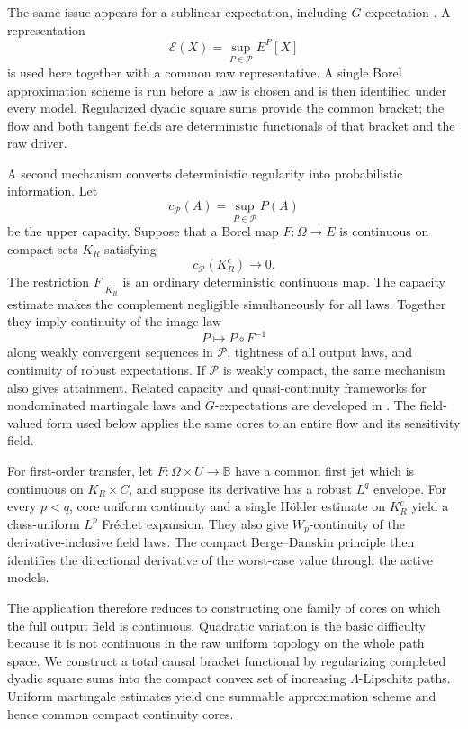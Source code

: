 \documentclass[11pt,reqno]{amsart}
\theoremstyle{plain}
\theoremstyle{definition}
\newcommand{\cP}{\mathcal P}
\begin{document}
The same issue appears for a sublinear expectation, including
\(G\)-expectation \cite{Peng19}.  A representation
\[
  \mathcal E(X)=\sup_{P\in\cP}E^P[X]
\]
is used here together with a common raw representative.  A single Borel
approximation scheme is run before a law is chosen and is then identified
under every model.  Regularized dyadic square sums provide the common
bracket; the flow and both tangent fields are deterministic functionals of
that bracket and the raw driver.

A second mechanism converts deterministic regularity into probabilistic
information.  Let
\[
  c_{\cP}(A)=\sup_{P\in\cP}P(A)
\]
be the upper capacity.  Suppose that a Borel map \(F:\Omega\to E\) is
continuous on compact sets \(K_R\) satisfying
\[
  c_{\cP}(K_R^c)\longrightarrow0.
\]
The restriction \(F|_{K_R}\) is an ordinary deterministic continuous map.
The capacity estimate makes the complement negligible simultaneously for
all laws.  Together they imply continuity of the image law
\[
  P\longmapsto P\circ F^{-1}
\]
along weakly convergent sequences in \(\cP\), tightness of all output laws,
and continuity of robust expectations.  If \(\cP\) is weakly compact, the
same mechanism also gives attainment.  Related capacity and
quasi-continuity frameworks for nondominated martingale laws and
\(G\)-expectations are developed in
\cite{DenisMartini06,DenisHuPeng11,HuWangZheng16}.  The field-valued form
used below applies the same cores to an entire flow and its sensitivity
field.

For first-order transfer, let
\(F:\Omega\times U\to\mathbb B\) have a common first jet which is
continuous on \(K_R\times C\), and suppose its derivative has a robust
\(L^q\) envelope.  For every \(p<q\), core uniform continuity and a single
H\"older estimate on \(K_R^c\) yield a class-uniform \(L^p\) Fr\'echet
expansion.  They also give \(W_p\)-continuity of the derivative-inclusive
field laws.  The compact Berge--Danskin principle then identifies the
directional derivative of the worst-case value through the active models.

The application therefore reduces to constructing one family of cores on
which the full output field is continuous.  Quadratic variation is the basic
difficulty because it is not continuous in the raw uniform topology on the
whole path space.  We construct a total causal bracket functional by
regularizing completed dyadic square sums into the compact convex set of
increasing \(\Lambda\)-Lipschitz paths.  Uniform martingale estimates yield one
summable approximation scheme and hence common compact continuity cores.
\end{document}

